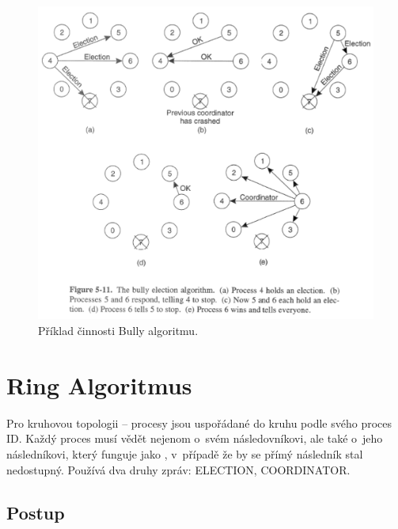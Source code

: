 \begin{figure}[H]
    \centering
    \includegraphics[width=1\linewidth]{example_bully.pdf}
    \caption{Příklad činnosti Bully algoritmu.}
\end{figure}


\section{Ring Algoritmus}

Pro kruhovou topologii -- procesy jsou uspořádané do kruhu podle svého proces ID.
Každý proces musí vědět nejenom o~svém následovníkovi, ale také o~jeho následníkovi, který funguje jako , v~případě že by se přímý následník stal nedostupný. Používá dva druhy zpráv: ELECTION, COORDINATOR.

\subsection{Postup}

